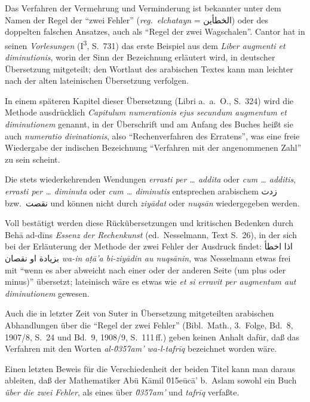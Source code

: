 \documentclass[11pt,a4paper]{article}
\newcommand{\RL}[1]{\beginR#1\endR}
\newcommand{\ar}[1]{{\arabicfont\RL{#1}}}
\newcommand{\enquote}[1]{``#1''}
\begin{document}
Das Verfahren der Vermehrung und Verminderung ist bekannter unter dem Namen der Regel der \enquote{zwei Fehler} (\textit{reg.\ elchatayn} = \ar{الخطأين}) oder des doppelten falschen Ansatzes, auch als \enquote{Regel der zwei Wagschalen}. Cantor hat in seinen \textit{Vorlesungen} (I\textsuperscript{3}, S.\ 731) das erste Beispiel aus dem \textit{Liber augmenti et diminutionis}, worin der Sinn der Bezeichnung erl\"autert wird, in deutscher \"Ubersetzung mitgeteilt; den Wortlaut des arabischen Textes kann man leichter nach der alten lateinischen \"Ubersetzung verfolgen.

In einem sp\"ateren Kapitel dieser \"Ubersetzung (Libri a.\ a.\ O., S.\ 324) wird die Methode ausdr\"ucklich \textit{Capitulum numerationis ejus secundum augmentum et diminutionem} genannt, in der \"Uberschrift und am Anfang des Buches hei\ss{}t sie auch \textit{numeratio divinationis}, also \enquote{Rechenverfahren des Erratens}, was eine freie Wiedergabe der indischen Bezeichnung \enquote{Verfahren mit der angenommenen Zahl} zu sein scheint.

Die stets wiederkehrenden Wendungen \textit{errasti per \ldots{} addita} oder \textit{cum \ldots{} additis}, \textit{errasti per \ldots{} diminuta} oder \textit{cum \ldots{} diminutis} entsprechen arabischem \ar{زدت} bzw.\ \ar{نقصت} und k\"onnen nicht durch \textit{ziy\=adat} oder \textit{nuqs\=an} wiedergegeben werden.

Voll best\"atigt werden diese R\"uck\"ubersetzungen und kritischen Bedenken durch Beh\=a{} ad-d\={i}ns \textit{Essenz der Rechenkunst} (ed.\ Nesselmann, Text S.\ 26), in der sich bei der Erl\"auterung der Methode der zwei Fehler der Ausdruck findet: \ar{اذا اخطأ بزيادة او نقصان} \textit{wa-in a\d{t}\=a'a bi-ziy\=adin au nuqs\=anin}, was Nesselmann etwas frei mit \enquote{wenn es aber abweicht nach einer oder der anderen Seite (um plus oder minus)} \"ubersetzt; lateinisch w\"are es etwas wie \textit{et si erravit per augmentum aut diminutionem} gewesen.

Auch die in letzter Zeit von Suter in \"Ubersetzung mitgeteilten arabischen Abhandlungen \"uber die \enquote{Regel der zwei Fehler} (Bibl.\ Math., 3.\ Folge, Bd.\ 8, 1907/8, S.\ 24 und Bd.\ 9, 1908/9, S.\ 111\,ff.) geben keinen Anhalt daf\"ur, da\ss{} das Verfahren mit den Worten \textit{al-\u0357{}am' wa-l-tafr\={i}q} bezeichnet worden w\"are.

Einen letzten Beweis f\"ur die Verschiedenheit der beiden Titel kann man daraus ableiten, da\ss{} der Mathematiker Ab\"u K\=amil \u015e\=uc\=a' b.\ Aslam sowohl ein Buch \textit{\"uber die zwei Fehler}, als eines \"uber \textit{\u0357{}am'} und \textit{tafr\={i}q} verfa\ss{}te.
\end{document}
